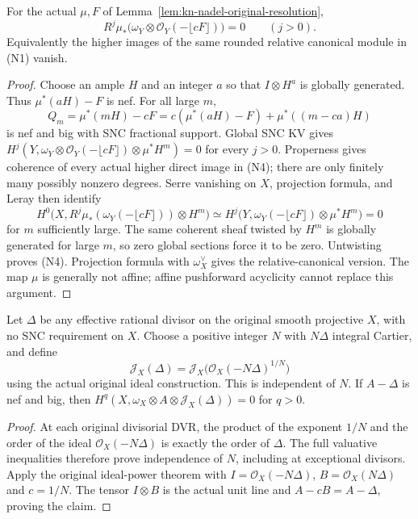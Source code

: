 \begin{lemma}
\label{lem:kn-nadel-local-vanishing}
\notready
For the actual $\mu,F$ of
Lemma~\ref{lem:kn-nadel-original-resolution},
\[
 R^j\mu_*\bigl(\omega_Y\otimes
                  \mathcal O_Y(-\lfloor cF\rfloor)\bigr)=0
 \qquad(j>0).
 \tag{N4}
\]
Equivalently the higher images of the same rounded relative canonical
module in (N1) vanish.
\end{lemma}
\begin{proof}
Choose an ample $H$ and an integer $a$ so that $I\otimes H^a$ is
globally generated.  Thus $\mu^*(aH)-F$ is nef.  For all large $m$,
\[
 Q_m=\mu^*(mH)-cF
    =c(\mu^*(aH)-F)+\mu^*((m-ca)H)
\]
is nef and big with SNC fractional support.  Global SNC KV gives
$H^j(Y,\omega_Y\otimes\mathcal O_Y(-\lfloor cF\rfloor)
                    \otimes\mu^*H^m)=0$ for every $j>0$.
Properness gives coherence of every actual higher direct image in
(N4); there are only finitely many possibly nonzero degrees.
Serre vanishing on $X$, projection formula, and Leray then identify
\[
 H^0\bigl(X,R^j\mu_*(\omega_Y(-\lfloor cF\rfloor))\otimes H^m\bigr)
 \simeq
 H^j\bigl(Y,\omega_Y(-\lfloor cF\rfloor)\otimes\mu^*H^m\bigr)=0
\]
for $m$ sufficiently large.  The same coherent sheaf twisted by
$H^m$ is globally generated for large $m$, so zero global sections
force it to be zero.  Untwisting proves (N4).  Projection formula
with $\omega_X^\vee$ gives the relative-canonical version.  The map
$\mu$ is generally not affine; affine pushforward acyclicity cannot
replace this argument.
\end{proof}

\begin{corollary}
\label{cor:kn-nadel-q-divisor}
\notready
Let $\Delta$ be any effective rational divisor on the original
smooth projective $X$, with no SNC requirement on $X$.  Choose a
positive integer $N$ with $N\Delta$ integral Cartier, and define
\[
 \mathcal J_X(\Delta)
   =\mathcal J_X\bigl(\mathcal O_X(-N\Delta)^{1/N}\bigr)
\]
using the actual original ideal construction.  This is independent
of $N$.  If $A-\Delta$ is nef and big, then
$H^q(X,\omega_X\otimes A\otimes\mathcal J_X(\Delta))=0$ for $q>0$.
\end{corollary}
\begin{proof}
At each original divisorial DVR, the product of the exponent $1/N$
and the order of the ideal $\mathcal O_X(-N\Delta)$ is exactly the
order of $\Delta$.  The full valuative inequalities therefore prove
independence of $N$, including at exceptional divisors.  Apply the
original ideal-power theorem with $I=\mathcal O_X(-N\Delta)$,
$B=\mathcal O_X(N\Delta)$ and $c=1/N$.  The tensor $I\otimes B$ is
the actual unit line and $A-cB=A-\Delta$, proving the claim.
\end{proof}

